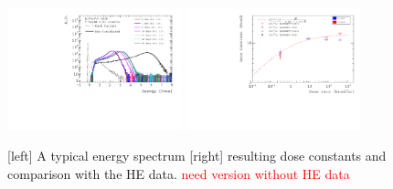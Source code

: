 \documentclass[review]{elsarticle}
\begin{document}
\begin{figure}[hbtp]
\centering
\includegraphics[width=0.45\textwidth]{figures/AlphaSourceMeasurement-EJ200PVT_1X1P_NISTRound4Set3.pdf}
\includegraphics[width=0.45\textwidth]{figures/DoseConstVsDoseRate.pdf}
    \caption{
[left] A typical energy spectrum 
[right] resulting dose constants and comparison with the HE data. \textcolor{red}{need version without HE data}
    }
    \label{fig:GY_more2}
\end{figure}
\end{document}

